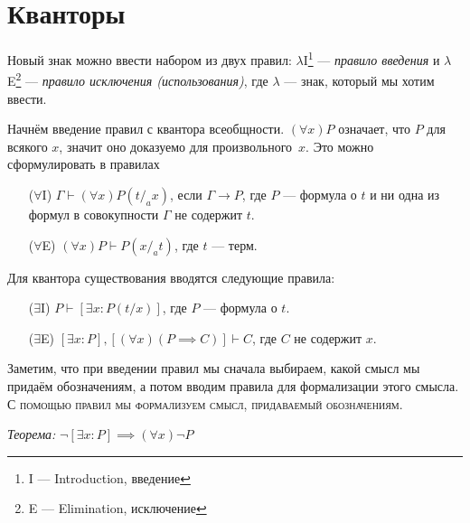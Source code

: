 \section{Кванторы}

\newcommand\Aii{$\forall$I}
\newcommand\Aee{$\forall$E}
\newcommand\Eii{$\exists$I}
\newcommand\Eee{$\exists$E}

Новый знак можно ввести набором из двух правил:
$\lambda$I\footnote{I --- Introduction, введение} --- {\it правило введения}
и $\lambda$E\footnote{E --- Elimination, исключение} --- {\it правило
исключения (использования)}, где $\lambda$ --- знак, который мы хотим ввести.

Начнём введение правил с квантора всеобщности. $(\forall x)P$ означает, что $P$ для
всякого $x$, значит оно доказуемо для произвольного~$x$. Это можно сформулировать
в правилах
\begin{enumerate}
	\item[(\Aii{})]{}$\Gamma\vdash(\forall x)P(t/_{a}x)$, если $\Gamma\to P$, где
	$P$ --- формула о $t$ и ни одна из формул в совокупности $\Gamma$
	не содержит $t$.

	\item[(\Aee{})]{}$(\forall x)P\vdash P(x/_{a}t)$, где $t$ --- терм.
\end{enumerate}

Для квантора существования вводятся следующие правила:
\begin{enumerate}
	\item[(\Eii{})]$P\vdash [\exists x:P(t/x)]$, где $P$ --- формула о $t$.
	\item[(\Eee{})]$[\exists x:P],[(\forall x)(P\implies C)]\vdash C$,
	где $C$ не содержит $x$.
\end{enumerate}

Заметим, что при введении правил мы
сначала выбираем, какой смысл мы придаём обозначениям, а потом вводим
правила для формализации этого смысла.
\textsc{С помощью правил мы формализуем смысл, придаваемый обозначениям.}

{\it Теорема:} $\lnot [\exists x:P]\implies  (\forall x)\lnot P$

